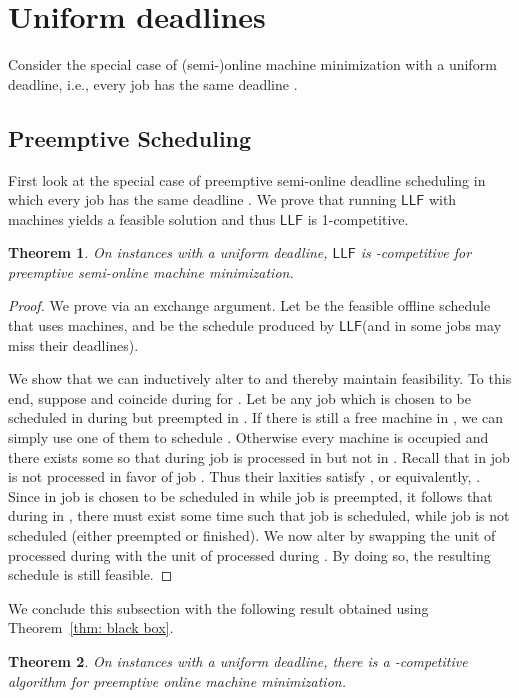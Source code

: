 \documentclass[letterpaper,11pt]{article}
\newtheorem{theorem}{Theorem}
\newcommand{\LLF}{\ensuremath{\mathsf{LLF}}\xspace}
\begin{document}
\section{Uniform deadlines}
\label{sec:special-cases3}

Consider the special case of (semi-)online machine minimization with a uniform deadline, i.e., every job  has the same deadline .

\subsection{Preemptive Scheduling}

First look at the special case of preemptive semi-online deadline scheduling in which every job  has the same deadline . We prove that running \LLF with  machines yields a feasible solution and thus \LLF is 1-competitive. 

\begin{theorem}\label{thm:pre-samedeadline-optknown}
On instances with a uniform deadline, \LLF is -competitive for preemptive semi-online machine minimization.
\end{theorem}
\begin{proof}
We prove via an exchange argument. Let  be the feasible offline schedule that uses  machines, and  be the schedule produced by \LLF (and in  some jobs may miss their deadlines). 

We show that we can inductively alter  to  and thereby maintain feasibility. To this end, suppose  and  coincide during  for . Let  be any job which is chosen to be scheduled in  during  but preempted in . If there is still a free machine in , we can simply use one of them to schedule . Otherwise every machine is occupied and there exists some  so that during  job  is processed in  but not in . Recall that in  job  is not processed in favor of job . Thus their laxities satisfy , or equivalently, . Since in  job  is chosen to be scheduled in  while job  is preempted, it follows that during  in , there must exist some time  such that job  is scheduled, while job  is not scheduled (either preempted or finished). We now alter  by swapping the unit of  processed during  with the unit of  processed during . By doing so, the resulting schedule is still feasible.
\end{proof}



We conclude this subsection with the following result obtained using Theorem~\ref{thm: black box}.
\begin{theorem}
  On instances with a uniform deadline, there is a -competitive algorithm for preemptive online machine minimization.
\end{theorem} 
\end{document}
